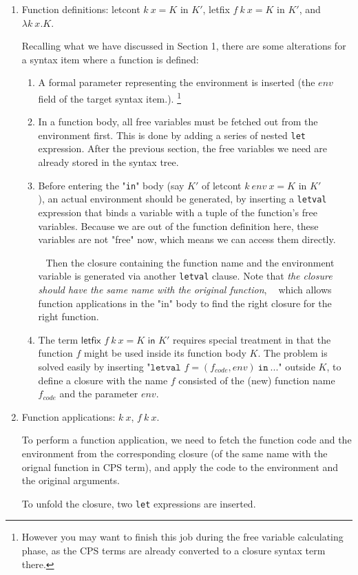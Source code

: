 \documentclass{article}
\theoremstyle{definition}
\theoremstyle{remark}
\numberwithin{equation}{section}
\begin{document}
\begin{enumerate}
  \item Function definitions: \textsf{letcont }$k\ x = K$\textsf{ in }$K'$,
  \textsf{letfix }$f\ k\ x=K$\textsf{ in }$K'$, and $\lambda k\ x.K$.

  Recalling what we have discussed in Section 1, there are some alterations for
  a syntax item where a function is defined:
  \begin{enumerate}
    \item A formal parameter representing the environment is inserted (the $env$
    field of the target syntax item.).
    \footnote{However you may want to finish this job during the free variable
    calculating phase, as the CPS terms are already converted to a closure syntax
    term there.}
    \item In a function body, all free variables must be fetched out from the
    environment first. This is done by adding a series of nested \texttt{let}
    expression. After the previous section, the free variables we need are
    already stored in the syntax tree.
    \item Before entering the "\texttt{in}" body (say $K'$ of
        \textsf{letcont }$k\ env\ x = K$\textsf{ in }$K'$\\),
    an actual environment should be generated, by inserting a \texttt{letval}
    expression that binds a variable with a tuple of the function's free
    variables. Because we are out of the function definition here, these variables
    are not "free" now, which means we can access them directly.

    $\ \ $ Then the closure containing the function name and the environment variable
    is generated via another \texttt{letval} clause. Note that
    \emph{the closure should have the same name with the original function},$\ \ \ \ $
    which allows function applications in the "in" body to find the right closure
    for the right function.
    \item The term $\textsf{letfix }f\ k\ x=K\textsf{ in }K'$
    requires special treatment in that the function $f$ might be used inside its
    function body $K$. The problem is solved easily by inserting
    "$\texttt{letval }f=(f_{code}, env)\ \texttt{in}\ ...$" outside $K$, to define
    a closure with the name $f$ consisted of the (new) function name $f_{code}$ and
    the parameter $env$.
  \end{enumerate}
  \item Function applications: $k\ x$, $f\ k\ x$.


  To perform a function application, we need to fetch the function code and the
  environment from the corresponding closure (of the same name with the orignal
  function in CPS term), and apply the code to the environment and the original
  arguments.


  To unfold the closure, two \texttt{let} expressions are inserted.
\end{enumerate}
\end{document}
